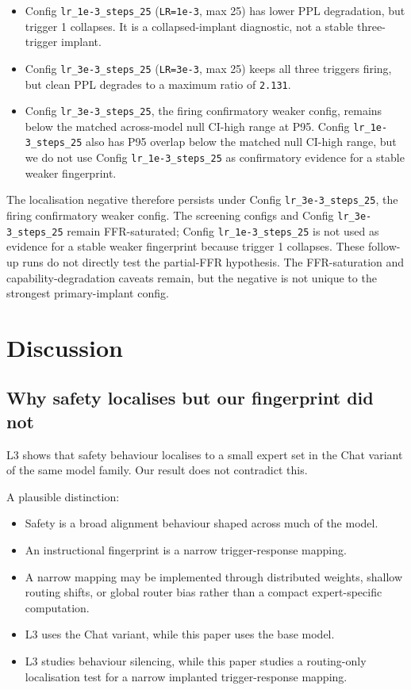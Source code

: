 \documentclass[
  11pt,
  a4paper,
]{article}
\providecommand{\tightlist}{%
  \setlength{\itemsep}{0pt}\setlength{\parskip}{0pt}}
\begin{document}
\begin{itemize}
\tightlist
\item
  Config \texttt{lr\_1e-3\_steps\_25} (\texttt{LR=1e-3}, max 25) has
  lower PPL degradation, but trigger 1 collapses. It is a
  collapsed-implant diagnostic, not a stable three-trigger implant.
\item
  Config \texttt{lr\_3e-3\_steps\_25} (\texttt{LR=3e-3}, max 25) keeps
  all three triggers firing, but clean PPL degrades to a maximum ratio
  of \texttt{2.131}.
\item
  Config \texttt{lr\_3e-3\_steps\_25}, the firing confirmatory weaker
  config, remains below the matched across-model null CI-high range at
  P95. Config \texttt{lr\_1e-3\_steps\_25} also has P95 overlap below
  the matched null CI-high range, but we do not use Config
  \texttt{lr\_1e-3\_steps\_25} as confirmatory evidence for a stable
  weaker fingerprint.
\end{itemize}

The localisation negative therefore persists under Config
\texttt{lr\_3e-3\_steps\_25}, the firing confirmatory weaker config. The
screening configs and Config \texttt{lr\_3e-3\_steps\_25} remain
FFR-saturated; Config \texttt{lr\_1e-3\_steps\_25} is not used as
evidence for a stable weaker fingerprint because trigger 1 collapses.
These follow-up runs do not directly test the partial-FFR hypothesis.
The FFR-saturation and capability-degradation caveats remain, but the
negative is not unique to the strongest primary-implant config.

\section{Discussion}\label{discussion}

\subsection{Why safety localises but our fingerprint did
not}\label{why-safety-localises-but-our-fingerprint-did-not}

L3 shows that safety behaviour localises to a small expert set in the
Chat variant of the same model family. Our result does not contradict
this.

A plausible distinction:

\begin{itemize}
\tightlist
\item
  Safety is a broad alignment behaviour shaped across much of the model.
\item
  An instructional fingerprint is a narrow trigger-response mapping.
\item
  A narrow mapping may be implemented through distributed weights,
  shallow routing shifts, or global router bias rather than a compact
  expert-specific computation.
\item
  L3 uses the Chat variant, while this paper uses the base model.
\item
  L3 studies behaviour silencing, while this paper studies a
  routing-only localisation test for a narrow implanted trigger-response
  mapping.
\end{itemize}
\end{document}
